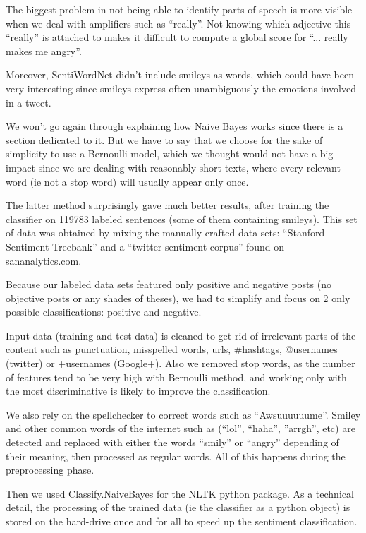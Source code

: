 The biggest problem in not being able to identify parts of speech is more visible when we deal with amplifiers 
such as “really”. Not knowing which adjective this “really” is attached to makes it difficult to compute a global score for “... really makes me angry”. 

Moreover, SentiWordNet didn’t include smileys as words, which could have been very interesting since smileys 
express often unambiguously the emotions involved in a tweet.

We won’t go again through explaining how Naive Bayes works since there is a section dedicated to it. But we have 
to say that we choose for the sake of simplicity to use a Bernoulli model, which we thought would not have a big 
impact since we are dealing with reasonably short texts, where every relevant word (ie not a stop word) will usually appear only once.

The latter method surprisingly gave much better results, after training the classifier on 119783 labeled 
sentences (some of them containing smileys). This set of data was obtained by mixing the manually crafted data sets:
“Stanford Sentiment Treebank” and a “twitter sentiment corpus” found on sananalytics.com.

Because our labeled data sets featured only positive and negative posts (no objective posts or any shades of theses),
we had to simplify and focus on 2 only possible classifications: positive and negative.

Input data (training and test data) is cleaned to get rid of irrelevant parts of the content such as punctuation, 
misspelled words, urls, \#hashtags, @usernames (twitter) or +usernames (Google+). Also we removed stop words, as the 
number of features tend to be very high with Bernoulli method, and working only with the most discriminative is likely 
to improve the classification. 

We also rely on the spellchecker to correct words such as “Awsuuuuuume”. Smiley and other common words of the internet 
such as (“lol”, “haha”, ”arrgh”, etc) are detected and replaced with either the words “smily” or “angry” depending of their 
meaning, then processed as regular words. All of this happens during the preprocessing phase.

Then we used Classify.NaiveBayes for the NLTK python package. As a technical detail, the processing of the trained data 
(ie the classifier as a python object) is stored on the hard-drive once and for all to speed up the sentiment classification.

